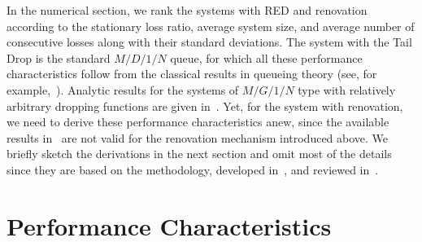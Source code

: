 \begin{multicols}{2}
In the numerical section, we rank the systems with RED 
and renovation according to the stationary loss ratio, average system size,  
and average number of consecutive losses along with their standard deviations. 
The system with the Tail Drop is the standard $M/D/1/N$ queue, 
for which all these performance characteristics follow
from the classical results in queueing theory (see, for example,~\cite{Riordan1962}).
Analytic results for the systems of $M/G/1/N$ type with relatively 
arbitrary dropping functions are given in~\cite{Chyd}.
Yet, for the system with renovation, we need to derive these 
performance characteristics anew, since 
the available results in~\cite{Zaryadov2010,Zaryadov2009} 
are not valid for the renovation mechanism introduced above.
We briefly sketch the derivations in the next
section and omit most of the details
since they are based on the methodology, 
developed in~\cite{Zaryadov2010,Zaryadov2009},
and reviewed in~\cite{arxivRK}.



\section{Performance Characteristics}


\end{multicols}
